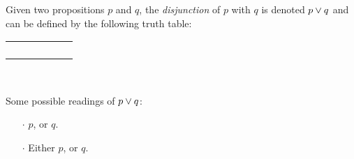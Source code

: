 \begin{definition}[Disjunction]
    \begin{center}
        \begin{minipage}[t]{.55\linewidth}
            Given two propositions \(p\) and \(q\), the \emph{disjunction} of \(p\) with \(q\)
            is denoted \(p \vee q\) and can be defined by the following truth table:
            \begin{table}[H]
                \centering
                \label{tab:or}
                \begin{tabular}{|CcCc||Cc|}
                    \hline
                     &  &  \\ \hline
                    \thead{\(\top\)} & \thead{\(\top\)} &  \\
                    \thead{\(\top\)} & \thead{\(\bot\)} &  \\
                    \thead{\(\bot\)} & \thead{\(\top\)} &  \\
                    \thead{\(\bot\)} & \thead{\(\bot\)} &  \\ \hline
                \end{tabular}
            \end{table}
        \end{minipage}%
        \begin{minipage}[t]{.05\linewidth}
            ~
        \end{minipage}%
        \begin{minipage}[t]{.4\linewidth}
            Some possible readings of \(p \vee q\):\\
            \begin{itemize}
                \item[\(\cdot\)]
                    \(p\), or \(q\).
                \item[\(\cdot\)]
                    Either \(p\), or \(q\).
            \end{itemize}
        \end{minipage}
    \end{center}
\end{definition}

\newpage

